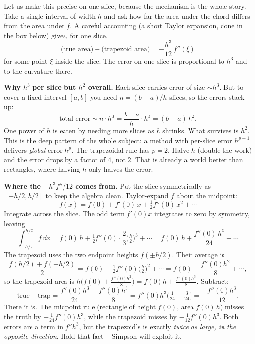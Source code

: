 Let us make this precise on one slice, because the mechanism is the whole story. Take a single interval of width $h$ and ask how far the area under the chord differs from the area under $f$. A careful accounting (a short Taylor expansion, done in the box below) gives, for one slice,
\[
\text{(true area)} - \text{(trapezoid area)} = -\frac{h^3}{12}\, f''(\xi)
\]
for some point $\xi$ inside the slice. The error on one slice is proportional to $h^3$ and to the curvature there.

\begin{happeningbox}
\textbf{Why $h^3$ per slice but $h^2$ overall.} Each slice carries error of size $\sim h^3$. But to cover a fixed interval $[a,b]$ you need $n = (b-a)/h$ slices, so the errors stack up:
\[
\text{total error} \sim n \cdot h^3 = \frac{b-a}{h}\cdot h^3 = (b-a)\,h^2.
\]
One power of $h$ is eaten by needing more slices as $h$ shrinks. What survives is $h^2$. This is the deep pattern of the whole subject: a method with per-slice error $h^{p+1}$ delivers \emph{global} error $h^{p}$. The trapezoidal rule has $p=2$. Halve $h$ (double the work) and the error drops by a factor of $4$, not $2$. That is already a world better than rectangles, where halving $h$ only halves the error.
\end{happeningbox}

\begin{whybox}
\textbf{Where the $-h^3 f''/12$ comes from.} Put the slice symmetrically as $[-h/2, h/2]$ to keep the algebra clean. Taylor-expand $f$ about the midpoint:
\[
f(x) = f(0) + f'(0)\,x + \tfrac12 f''(0)\,x^2 + \cdots
\]
Integrate across the slice. The odd term $f'(0)x$ integrates to zero by symmetry, leaving
\[
\int_{-h/2}^{h/2} f\,\dd x = f(0)\,h + \tfrac12 f''(0)\cdot \frac{2}{3}\Big(\tfrac{h}{2}\Big)^3 + \cdots = f(0)\,h + \frac{f''(0)\,h^3}{24} + \cdots
\]
The trapezoid uses the two endpoint heights $f(\pm h/2)$. Their average is
\[
\frac{f(h/2)+f(-h/2)}{2} = f(0) + \tfrac12 f''(0)\Big(\tfrac{h}{2}\Big)^2 + \cdots = f(0) + \frac{f''(0)h^2}{8} + \cdots,
\]
so the trapezoid area is $h\big(f(0) + \tfrac{f''(0)h^2}{8}\big) = f(0)h + \frac{f''(0)h^3}{8}$. Subtract:
\[
\text{true} - \text{trap} = \frac{f''(0)h^3}{24} - \frac{f''(0)h^3}{8} = f''(0)h^3\Big(\tfrac{1}{24} - \tfrac{3}{24}\Big) = -\frac{f''(0)h^3}{12}.
\]
There it is. The midpoint rule (rectangle of height $f(0)$, area $f(0)\,h$) misses the truth by $+\tfrac{1}{24}f''(0)h^3$, while the trapezoid misses by $-\tfrac{1}{12}f''(0)h^3$. Both errors are a term in $f'' h^3$, but the trapezoid's is exactly \emph{twice as large, in the opposite direction}. Hold that fact -- Simpson will exploit it.
\end{whybox}


